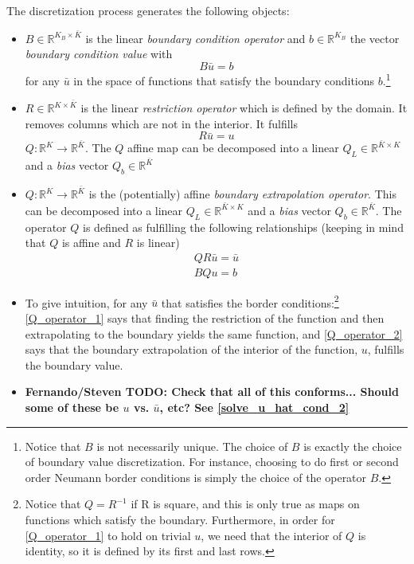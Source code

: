 \documentclass[11pt]{article}
\newcommand{\R}{\ensuremath{\mathbb{R}}}
\begin{document}
	The discretization process generates the following objects:
	\begin{itemize}
		\item $B\in \R^{K_B \times \bar{K}}$ is the linear \textit{boundary condition operator} and $b \in \R^{K_B}$ the vector \textit{boundary condition value} with
		\begin{equation}
		B \bar{u} = b
		\label{B_operator_block}
		\end{equation}
		for any $\bar{u}$ in the space of functions that satisfy the boundary conditions $b$.\footnote{
Notice that $B$ is not necessarily unique. The choice of $B$ is exactly the choice of boundary value discretization. For instance, choosing to do first or second order Neumann border conditions is simply the choice of the operator $B$.}
		\item $R\in \R^{K\times \bar{K}}$ is the linear \textit{restriction operator} which is defined by the domain. It removes columns which are not in the interior. It fulfills
		\begin{equation}
		R \bar{u} = u \label{R_operator}
		\end{equation}
$Q : \R^K \to \R^{\bar{K}}$.  The $Q$ affine map can be decomposed into a linear $Q_L \in \R^{\bar{K}\times K}$ and a \textit{bias} vector $Q_b \in \R^{\bar{K}}$
		\item $Q : \R^K \to \R^{\bar{K}}$ is the (potentially) affine \textit{boundary extrapolation operator}.  This can be decomposed into a linear $Q_L \in \R^{\bar{K}\times K}$ and a \textit{bias} vector $Q_b \in \R^{\bar{K}}$.  The operator $Q$ is defined as fulfilling the following relationships (keeping in mind that $Q$ is affine and $R$ is linear)
		\begin{align}
		Q  R\bar{u} = \bar{u}\label{Q_operator_1}\\
		B Q u  = b	\label{Q_operator_2}
	\end{align}
	\item To give intuition, for any $\bar{u}$ that satisfies the border conditions:\footnote{Notice that $Q = R^{-1}$ if R is square, and this is only true as maps on functions which satisfy the boundary.  Furthermore, in order for \cref{Q_operator_1} to hold on trivial $u$, we need that the interior of $Q$ is identity, so it is defined by its first and last rows.} \cref{Q_operator_1} says that finding the restriction of the function and then extrapolating to the boundary yields the same function, and \cref{Q_operator_2} says that the boundary extrapolation of the interior of the function, $u$, fulfills the boundary value.
			\item \textbf{Fernando/Steven TODO: Check that all of this conforms...  Should some of these be $u$ vs. $\bar{u}$, etc?  See \cref{solve_u_hat_cond_2}}
		\end{itemize}
\end{document}
